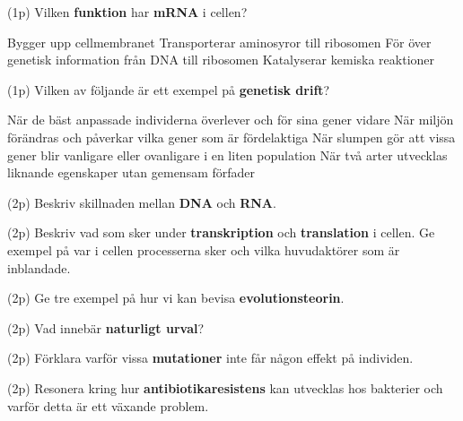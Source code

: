 \documentclass{exam}
\begin{document}
\begin{questions}
\question (1p) Vilken \textbf{funktion} har \textbf{mRNA} i cellen?
\begin{checkboxes}
   \choice Bygger upp cellmembranet
   \choice Transporterar aminosyror till ribosomen
   \correctchoice För över genetisk information från DNA till ribosomen
   \choice Katalyserar kemiska reaktioner
\end{checkboxes}
\vspace{5mm}

\question (1p) Vilken av följande är ett exempel på \textbf{genetisk drift}?
\begin{checkboxes}
   \choice När de bäst anpassade individerna överlever och för sina gener vidare
   \choice När miljön förändras och påverkar vilka gener som är fördelaktiga
   \correctchoice När slumpen gör att vissa gener blir vanligare eller ovanligare i en liten population
   \choice När två arter utvecklas liknande egenskaper utan gemensam förfader
\end{checkboxes}
\vspace{5mm}

\end{questions}

\break

\begin{center}
\end{center}
\vspace{5mm}
\begin{questions}

\question (2p) Beskriv skillnaden mellan \textbf{DNA} och \textbf{RNA}.
\vspace{40mm}

\question (2p) Beskriv vad som sker under \textbf{transkription} och \textbf{translation} i cellen. Ge exempel på var i cellen processerna sker och vilka huvudaktörer som är inblandade.
\vspace{40mm}

\question (2p) Ge tre exempel på hur vi kan bevisa \textbf{evolutionsteorin}.
\vspace{40mm}

\newpage

\question (2p) Vad innebär \textbf{naturligt urval}?
\vspace{40mm}

\question (2p) Förklara varför vissa \textbf{mutationer} inte får någon effekt på individen.
\vspace{40mm}

\question (2p) Resonera kring hur \textbf{antibiotikaresistens} kan utvecklas hos bakterier och varför detta är ett växande problem.
\vspace{40mm}

\end{questions}
\end{document}
